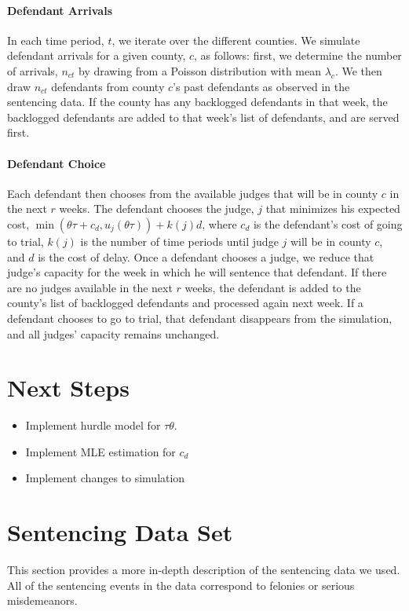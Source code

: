 \documentclass[11pt]{article}
\theoremstyle{ModifiedStyle}
\begin{document}
  \paragraph{Defendant Arrivals} In each time period, $t$, we iterate over the different counties. We simulate defendant arrivals for a given county, $c$, as follows: first, we determine the number of arrivals, $n_{ct}$ by drawing from a Poisson distribution with mean $\lambda_c$. We then draw $n_{ct}$ defendants from county $c$'s past defendants as observed in the sentencing data. If the county has any backlogged defendants in that week, the backlogged defendants are added to that week's list of defendants, and are served first.

  \paragraph{Defendant Choice} Each defendant then chooses from the available judges that will be in
  county $c$ in the next $r$ weeks. The defendant chooses the judge, $j$ that minimizes his expected cost, $\min(\theta \tau + c_d,u_j(\theta \tau)) + k(j)d$, where $c_d$ is the defendant's cost of going to trial, $k(j)$ is the number of time periods until judge $j$ will be in county $c$, and $d$ is the cost of delay. Once a defendant chooses a judge, we reduce that judge's capacity for the week in which he will sentence that defendant. If there are no judges available in the next $r$ weeks, the defendant is added to the county's list of backlogged defendants and processed again next week. If a defendant chooses to go to trial, that defendant disappears from the simulation, and all judges' capacity remains unchanged.

\section{Next Steps}
  \begin{itemize}
    \item Implement hurdle model for $\tau \theta$.
    \item Implement MLE estimation for $c_d$
    \item Implement changes to simulation
  \end{itemize}

 \printbibliography

\appendix
\section{Sentencing Data Set}
  \label{Sec:Sentencing_Data_Description}
  This section provides a more in-depth description of the sentencing data we used. All of the sentencing events in the data correspond to felonies or serious misdemeanors.
\end{document}
